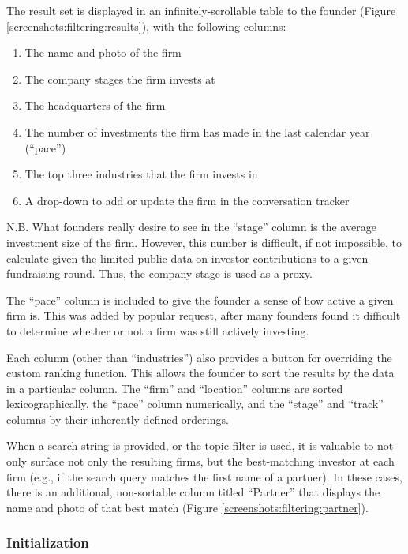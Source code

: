 The result set is displayed in an infinitely-scrollable table to the founder (Figure \ref{screenshots:filtering:results}), with the following columns:

\begin{enumerate}
  \item The name and photo of the firm
  \item The company stages the firm invests at
  \item The headquarters of the firm
  \item The number of investments the firm has made in the last calendar year (``pace'')
  \item The top three industries that the firm invests in
  \item A drop-down to add or update the firm in the conversation tracker
\end{enumerate}

N.B. What founders really desire to see in the ``stage'' column is the average investment size of the firm. However, this number is difficult, if not impossible, to calculate given the limited public data on investor contributions to a given fundraising round. Thus, the company stage is used as a proxy.

The ``pace'' column is included to give the founder a sense of how active a given firm is. This was added by popular request, after many founders found it difficult to determine whether or not a firm was still actively investing.

Each column (other than ``industries'') also provides a button for overriding the custom ranking function. This allows the founder to sort the results by the data in a particular column. The ``firm'' and ``location'' columns are sorted lexicographically, the ``pace'' column numerically, and the ``stage'' and ``track'' columns by their inherently-defined orderings.

When a search string is provided, or the topic filter is used, it is valuable to not only surface not only the resulting firms, but the best-matching investor at each firm (e.g., if the search query matches the first name of a partner). In these cases, there is an additional, non-sortable column titled ``Partner'' that displays the name and photo of that best match (Figure \ref{screenshots:filtering:partner}).

\subsubsection{Initialization}

